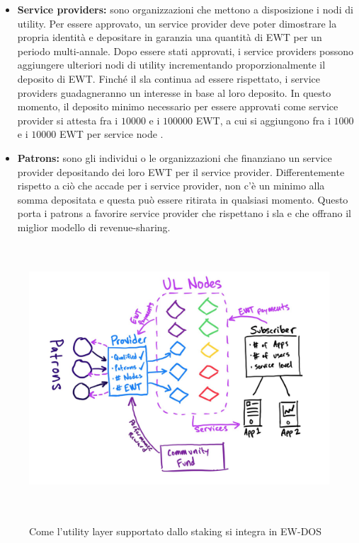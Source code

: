 \documentclass[12pt, letterpaper, twoside]{article}
\begin{document}
\begin{itemize}
    \item \textbf{Service providers:} sono organizzazioni che mettono a disposizione i nodi di utility. 
    Per essere approvato, un service provider deve poter dimostrare la propria identità e depositare in garanzia una quantità di EWT per un periodo multi-annale.
    Dopo essere stati approvati, i service providers possono aggiungere ulteriori nodi di utility incrementando proporzionalmente il deposito di EWT.
    Finché il \gls{sla} continua ad essere rispettato, i service providers guadagneranno un interesse in base al loro deposito.
    In questo momento, il deposito minimo necessario per essere approvati come service provider si attesta fra i $10000$ e i $100000$ EWT, a cui si aggiungono fra i $1000$ e i $10000$ EWT per service node \cite{art:ew-staking}.
    \item \textbf{Patrons:} sono gli individui o le organizzazioni che finanziano un service provider depositando dei loro EWT per il service provider.
    Differentemente rispetto a ciò che accade per i service provider, non c'è un minimo alla somma depositata e questa può essere ritirata in qualsiasi momento.
    Questo porta i patrons a favorire service provider che rispettano i \gls{sla} e che offrano il miglior modello di revenue-sharing.
\end{itemize}

\begin{figure}[!h]
    \includegraphics[height=10cm,keepaspectratio]{ew-staking.png}
    \centering
    \label{ew-staking}
    \caption{Come l'utility layer supportato dallo staking si integra in EW-DOS \cite{art:ew-staking}}
\end{figure}

\newpage

\printbibliography
\end{document}

